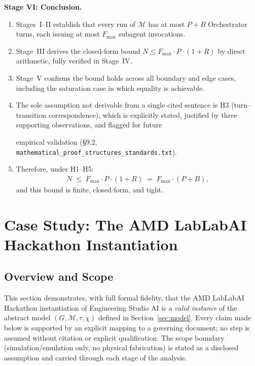 \documentclass[12pt]{article}
\theoremstyle{definition}
\newcommand{\code}[1]{\texttt{#1}}
\newcommand{\ProofStd}{\code{mathematical\_proof\_\allowbreak structures\_standards.txt}}
\begin{document}
\medskip
\noindent\textbf{Stage VI: Conclusion.}
\begin{enumerate}
    \item[VI.1] Stages~I--II establish that every run of $\mathcal{M}$
                has at most $P + B$ Orchestrator turns, each issuing at
                most $F_{\max}$ subagent invocations.
    \item[VI.2] Stage~III derives the closed-form bound
                $N \leq F_{\max} \cdot P \cdot (1+R)$ by direct
                arithmetic, fully verified in Stage~IV.
    \item[VI.3] Stage~V confirms the bound holds across all boundary and
                edge cases, including the saturation case in which
                equality is achievable.
    \item[VI.4] The sole assumption not derivable from a single
                cited sentence is H3 (turn--transition correspondence),
                which is explicitly stated, justified by three
                supporting observations, and flagged for future
                \begin{sloppypar}
                empirical validation (\S9.2,
                \ProofStd{}).
                \end{sloppypar}
    \item[VI.5] Therefore, under H1--H5:
                \begin{align}
                    \label{eq:final-bound}
                    N \;\leq\; F_{\max} \cdot P \cdot (1 + R)
                    \;=\; F_{\max} \cdot (P + B),
                \end{align}
                and this bound is finite, closed-form, and tight.
                \qedhere
\end{enumerate}


\section{Case Study: The AMD LabLabAI Hackathon Instantiation}
\label{sec:case-study}

\subsection{Overview and Scope}
\label{sec:case-study-overview}

This section demonstrates, with full formal fidelity, that the AMD
LabLabAI Hackathon instantiation of Engineering Studio AI is a
\emph{valid instance} of the abstract model $(G, \mathcal{M}, \tau,
\chi)$ defined in Section~\ref{sec:model}.  Every claim made below is
supported by an explicit mapping to a governing document; no step is
assumed without citation or explicit qualification.  The scope
boundary (simulation/emulation only, no physical fabrication) is
stated as a disclosed assumption and carried through each stage of the
analysis.
\end{document}
